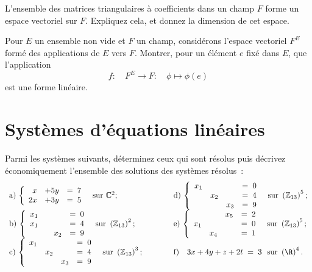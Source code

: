 \documentclass[12pt,french,oneside,a4paper]{memoir} %
\begin{document}
\begin{exo}
L'ensemble des matrices triangulaires à coefficients dans un champ $F$ forme un espace vectoriel sur $F$.  Expliquez cela, et donnez la dimension de cet espace.
\end{exo}
\begin{exo}
Pour $E$ un ensemble non vide et $F$ un champ, considérons l'espace vectoriel $F^E$ formé des applications de $E$ vers $F$.  Montrer, pour un élément $e$ fixé dans $E$, que l'application
\begin{equation*}
f:\quad F^E \to F:\quad \phi \mapsto \phi(e)
\end{equation*}
est une forme linéaire.
\end{exo}

\chapter{Systèmes d'équations linéaires}
\begin{exo}
Parmi les systèmes suivants, déterminez ceux qui sont résolus puis décrivez économiquement l'ensemble des solutions des systèmes résolus~:
\begin{equation*}
\begin{array}{l@{\qquad\qquad}l}
\mbox{a)} \, \left\{ \begin{array}{rrl}
x &+5y &=\;7 \\
2x &+3y &=\;5 \end{array} \right.
~~\mathrm{sur}~\mathbb C^2; 
&%
\mbox{d)} \, \left\{ \begin{array}{rrrl}
x_1 &     &     &=\;0 \\
    & x_2 &     &=\;4 \\
    &     & x_3 &=\;9 \end{array} \right.
~~\mathrm{sur}~\left(\mathbb Z_{13}\right)^5; 
\\%
\mbox{b)} \, \left\{ \begin{array}{rrrl}
x_1 &     &     &=\;0 \\
x_1 &     &     &=\;4 \\
    &     & x_2 &=\;9 \end{array} \right.
~~\mathrm{sur}~\left(\mathbb Z_{13}\right)^2;
&%
\mbox{e)} \, \left\{ \begin{array}{rrrl}
    &     & x_5 &=\;2 \\
x_1 &     &     &=\;0 \\
    & x_4 &     &=\;1 \\
\end{array} \right.
~~\mathrm{sur}~\left(\mathbb Z_{13}\right)^5;
\\%
\mbox{c)}   \, \left\{ \begin{array}{rrrl}
x_1 &     &     &=\;0 \\
    & x_2 &     &=\;4 \\
    &     & x_3 &=\;9 \end{array} \right.
    ~~\mathrm{sur}~\left(\mathbb Z_{13}\right)^3;
&%
\mbox{f)} \quad
3x +4y +z +2t \;=\;3  
~~\mathrm{sur}~\left(\mathbb \R\right)^4.
\end{array}
\end{equation*}
\end{exo}
\end{document}
